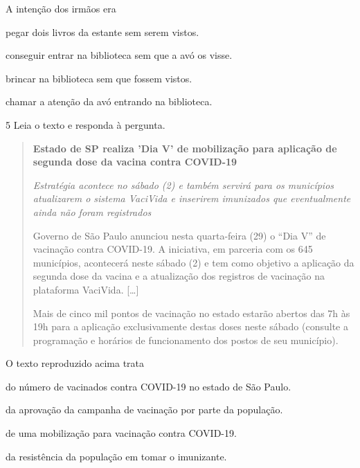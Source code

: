 A intenção dos irmãos era

\begin{escolha}
\item pegar dois livros da estante sem serem vistos.

\item conseguir entrar na biblioteca sem que a avó os visse.

\item brincar na biblioteca sem que fossem vistos.

\item chamar a atenção da avó entrando na biblioteca.
\end{escolha}

\num{5} Leia o texto e responda à pergunta.

\begin{quote}
\textbf{Estado de SP realiza 'Dia V' de mobilização para aplicação de
segunda dose da vacina contra COVID-19}

\textit{Estratégia acontece no sábado (2) e também servirá para os
municípios atualizarem o sistema VaciVida e inserirem imunizados que
eventualmente ainda não foram registrados}

Governo de São Paulo anunciou nesta quarta-feira (29) o ``Dia V'' de
vacinação contra COVID-19. A iniciativa, em parceria com os 645
municípios, acontecerá neste sábado (2) e tem como objetivo a aplicação
da segunda dose da vacina e a atualização dos registros de vacinação na
plataforma VaciVida. {[}\ldots{}{]}

Mais de cinco mil pontos de vacinação no estado estarão abertos das 7h
às 19h para a aplicação exclusivamente destas doses neste sábado
(consulte a programação e horários de funcionamento dos postos de seu
município).
\end{quote}


O texto reproduzido acima trata

\begin{escolha}
  \item do número de vacinados contra COVID-19 no estado de São Paulo.

  \item da aprovação da campanha de vacinação por parte da população.

  \item de uma mobilização para vacinação contra COVID-19.

  \item da resistência da população em tomar o imunizante.
\end{escolha}

